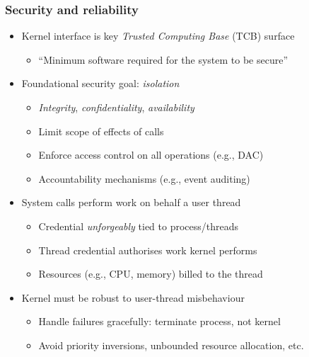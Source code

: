 \begin{frame}
  \frametitle{Security and reliability}

  \begin{itemize}
    \item Kernel interface is key \textit{Trusted Computing Base} (TCB)
      surface
    \begin{itemize}
      \item ``Minimum software required for the system to be secure''
    \end{itemize}

    \pause
    \medskip

    \item Foundational security goal: \textit{isolation}
    \begin{itemize}
      \item \textit{Integrity}, \textit{confidentiality}, \textit{availability}

      \pause

      \item Limit scope of effects of calls
      \item Enforce access control on all operations (e.g., DAC)
      \item Accountability mechanisms (e.g., event auditing)
    \end{itemize}

    \pause
    \medskip

    \item System calls perform work on behalf a user thread
    \begin{itemize}
      \item Credential \textit{unforgeably} tied to process/threads
      \item Thread credential authorises work kernel performs
      \item Resources (e.g., CPU, memory) billed to the thread
    \end{itemize}

    \pause
    \medskip

    \item Kernel must be robust to user-thread misbehaviour
    \begin{itemize}
      \item Handle failures gracefully: terminate process, not kernel
      \item Avoid priority inversions, unbounded resource allocation, etc.
    \end{itemize}

  \end{itemize}
\end{frame}

